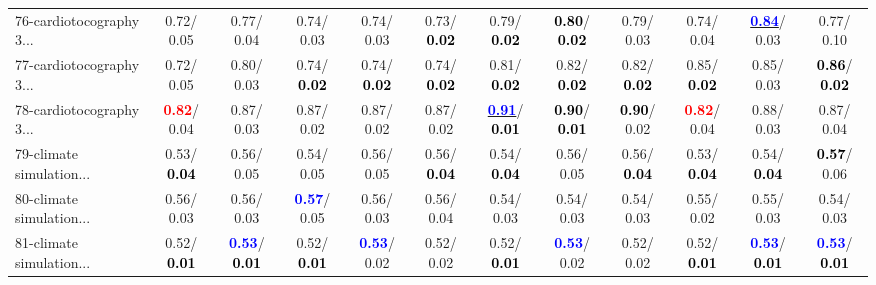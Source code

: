 \begin{table}[h]
\begin{center}
{\begin{tabular}{lc|c|c|c|c|c|c|c|c|c|c}
76-cardiotocography 3... &   0.72/  0.05 &   0.77/  0.04 &   0.74/  0.03 &   0.74/  0.03 &   0.73/\textcolor{black}{\textbf{  0.02}} &   0.79/\textcolor{black}{\textbf{  0.02}} & \textcolor{black}{\textbf{  0.80}}/\textcolor{black}{\textbf{  0.02}} &   0.79/  0.03 &   0.74/  0.04 & \underline{\textcolor{blue}{\textbf{  0.84}}}/  0.03 &   0.77/  0.10 \\
77-cardiotocography 3... &   0.72/  0.05 &   0.80/  0.03 &   0.74/\textcolor{black}{\textbf{  0.02}} &   0.74/\textcolor{black}{\textbf{  0.02}} &   0.74/\textcolor{black}{\textbf{  0.02}} &   0.81/\textcolor{black}{\textbf{  0.02}} &   0.82/\textcolor{black}{\textbf{  0.02}} &   0.82/\textcolor{black}{\textbf{  0.02}} &   0.85/\textcolor{black}{\textbf{  0.02}} &   0.85/  0.03 & \textcolor{black}{\textbf{  0.86}}/\textcolor{black}{\textbf{  0.02}} \\
78-cardiotocography 3... & \textcolor{red}{\textbf{  0.82}}/  0.04 &   0.87/  0.03 &   0.87/  0.02 &   0.87/  0.02 &   0.87/  0.02 & \underline{\textcolor{blue}{\textbf{  0.91}}}/\textcolor{black}{\textbf{  0.01}} & \textcolor{black}{\textbf{  0.90}}/\textcolor{black}{\textbf{  0.01}} & \textcolor{black}{\textbf{  0.90}}/  0.02 & \textcolor{red}{\textbf{  0.82}}/  0.04 &   0.88/  0.03 &   0.87/  0.04 \\ \hline
79-climate simulation... &   0.53/\textcolor{black}{\textbf{  0.04}} &   0.56/  0.05 &   0.54/  0.05 &   0.56/  0.05 &   0.56/\textcolor{black}{\textbf{  0.04}} &   0.54/\textcolor{black}{\textbf{  0.04}} &   0.56/  0.05 &   0.56/\textcolor{black}{\textbf{  0.04}} &   0.53/\textcolor{black}{\textbf{  0.04}} &   0.54/\textcolor{black}{\textbf{  0.04}} & \textcolor{black}{\textbf{  0.57}}/  0.06 \\
80-climate simulation... &   0.56/  0.03 &   0.56/  0.03 & \textcolor{blue}{\textbf{  0.57}}/  0.05 &   0.56/  0.03 &   0.56/  0.04 &   0.54/  0.03 &   0.54/  0.03 &   0.54/  0.03 &   0.55/  0.02 &   0.55/  0.03 &   0.54/  0.03 \\
81-climate simulation... &   0.52/\textcolor{black}{\textbf{  0.01}} & \textcolor{blue}{\textbf{  0.53}}/\textcolor{black}{\textbf{  0.01}} &   0.52/\textcolor{black}{\textbf{  0.01}} & \textcolor{blue}{\textbf{  0.53}}/  0.02 &   0.52/  0.02 &   0.52/\textcolor{black}{\textbf{  0.01}} & \textcolor{blue}{\textbf{  0.53}}/  0.02 &   0.52/  0.02 &   0.52/\textcolor{black}{\textbf{  0.01}} & \textcolor{blue}{\textbf{  0.53}}/\textcolor{black}{\textbf{  0.01}} & \textcolor{blue}{\textbf{  0.53}}/\textcolor{black}{\textbf{  0.01}} \\

\end{tabular}}
\end{center}
\end{table}
